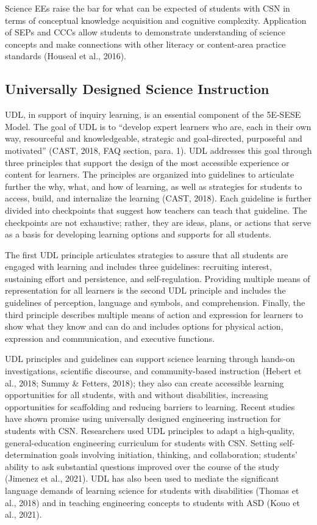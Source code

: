 \documentclass[11.5pt]{sig-alternate} %
\begin{document}
\begin{large}
Science EEs raise the bar for what can be expected of students with CSN in terms of conceptual knowledge acquisition and cognitive complexity. Application of SEPs and CCCs allow students to demonstrate understanding of science concepts and make connections with other literacy or content-area practice standards (Houseal et al., 2016).

\subsection*{Universally Designed Science Instruction}

UDL, in support of inquiry learning, is an essential component of the 5E-SESE Model. The goal of UDL is to “develop expert learners who are, each in their own way, resourceful and knowledgeable, strategic and goal-directed, purposeful and motivated” (CAST, 2018, FAQ section, para. 1). UDL addresses this goal through three principles that support the design of the most accessible experience or content for learners. The principles are organized into guidelines to articulate further the why, what, and how of learning, as well as strategies for students to access, build, and internalize the learning (CAST, 2018). Each guideline is further divided into checkpoints that suggest how teachers can teach that guideline. The checkpoints are not exhaustive; rather, they are ideas, plans, or actions that serve as a basis for developing learning options and supports for all students.

The first UDL principle articulates strategies to assure that all students are engaged with learning and includes three guidelines: recruiting interest, sustaining effort and persistence, and self-regulation. Providing multiple means of representation for all learners is the second UDL principle and includes the guidelines of perception, language and symbols, and comprehension. Finally, the third principle describes multiple means of action and expression for learners to show what they know and can do and includes options for physical action, expression and communication, and executive functions.

UDL principles and guidelines can support science learning through hands-on investigations, scientific discourse, and community-based instruction (Hebert et al., 2018; Summy \& Fetters, 2018); they also can create accessible learning opportunities for all students, with and without disabilities, increasing opportunities for scaffolding and reducing barriers to learning. Recent studies have shown promise using universally designed engineering instruction for students with CSN. Researchers used UDL principles to adapt a high-quality, general-education engineering curriculum for students with CSN. Setting self-determination goals involving initiation, thinking, and collaboration; students’ ability to ask substantial questions improved over the course of the study (Jimenez et al., 2021). UDL has also been used to mediate the significant language demands of learning science for students with disabilities (Thomas et al., 2018) and in teaching engineering concepts to students with ASD (Kouo et al., 2021).


\end{large}
\end{document}
